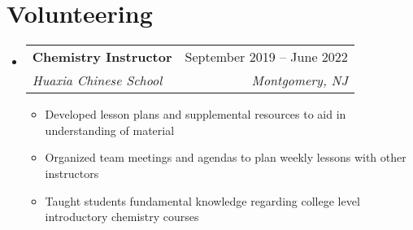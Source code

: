 \documentclass[letterpaper,11pt]{article}
\makeatletter
\newcommand{\resumeItem}[1]{
  \item\small{
    {#1 \vspace{-2pt}}
  }
}
\newcommand{\resumeSubheading}[4]{
  \vspace{-5pt}\item
    \begin{tabular*}{0.97\textwidth}[t]{l@{\extracolsep{\fill}}r}
      \textbf{#1} & #2 \\
      \textit{\small#3} & \textit{\small #4} \\
    \end{tabular*}\vspace{-5pt}
}
\newcommand{\resumeSubSubheading}[2]{
    \item
    \begin{tabular*}{0.97\textwidth}{l@{\extracolsep{\fill}}r}
      \textit{\small#1} & \textit{\small #2} \\
    \end{tabular*}\vspace{-5pt}
}
\newcommand{\resumeSubHeadingListStart}{\begin{itemize}[leftmargin=0.15in, label={}]}
\newcommand{\resumeSubHeadingListEnd}{\end{itemize}}
\newcommand{\resumeItemListStart}{\begin{itemize}}
\newcommand{\resumeItemListEnd}{\end{itemize}\vspace{-5pt}}
\makeatother
\begin{document}


\section{Volunteering}
\resumeSubHeadingListStart

  \resumeSubheading
    {Chemistry Instructor}{September 2019 -- June 2022}
    {Huaxia Chinese School}{Montgomery, NJ}
    \resumeItemListStart
      \resumeItem{Developed lesson plans and supplemental resources to aid in understanding of material}
      \resumeItem{Organized team meetings and agendas to plan weekly lessons with other instructors}
      \resumeItem{Taught students fundamental knowledge regarding college level introductory chemistry courses}
    \resumeItemListEnd

\resumeSubHeadingListEnd



\end{document}
